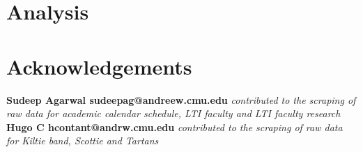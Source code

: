\documentclass[11pt]{article}
\begin{document}
\section{Analysis}

\clearpage
\section*{Acknowledgements}

\textbf{Sudeep Agarwal sudeepag@andreew.cmu.edu} \textit{contributed to the scraping of raw data for academic calendar schedule, LTI faculty and LTI faculty research}
\\
\textbf{Hugo C hcontant@andrw.cmu.edu} \textit{contributed to the scraping of raw data for Kiltie band, Scottie and Tartans}


\end{document}
